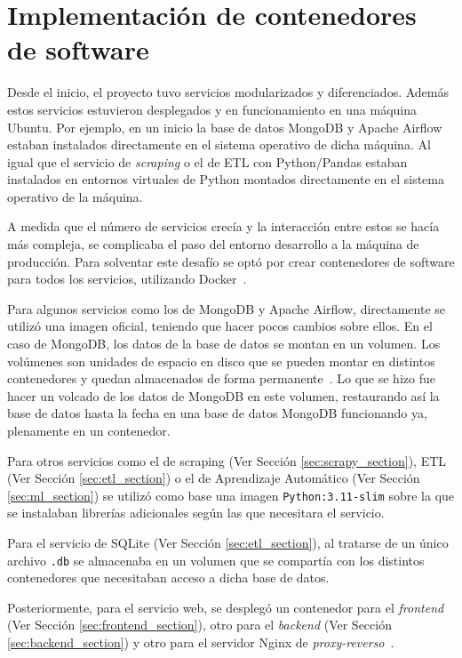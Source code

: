 \clearpage
\section{Implementación de contenedores de software}\label{sec:implementacion_docker}

Desde el inicio, el proyecto tuvo servicios modularizados y diferenciados. Además estos servicios estuvieron desplegados y en funcionamiento en una máquina Ubuntu. Por ejemplo, en un inicio la base de datos MongoDB y Apache Airflow estaban instalados directamente en el sistema operativo de dicha máquina. Al igual que el servicio de \textit{scraping} o el de ETL con Python/Pandas estaban instalados en entornos virtuales de Python montados directamente en el sistema operativo de la máquina. 

A medida que el número de servicios crecía y la interacción entre estos se hacía más compleja, se complicaba el paso del entorno desarrollo a la máquina de producción. Para solventar este desafío se optó por crear contenedores de software para todos los servicios, utilizando Docker~\cite{merkel2014docker}. 

Para algunos servicios como los de MongoDB y Apache Airflow, directamente se utilizó una imagen oficial, teniendo que hacer pocos cambios sobre ellos. En el caso de MongoDB, los datos de la base de datos se montan en un volumen. Los volúmenes son unidades de espacio en disco que se pueden montar en distintos contenedores y quedan almacenados de forma permanente~\cite{merkel2014docker}. Lo que se hizo fue hacer un volcado de los datos de MongoDB en este volumen, restaurando así la base de datos hasta la fecha en una base de datos MongoDB funcionando ya, plenamente en un contenedor.

Para otros servicios como el de scraping (Ver Sección \ref{sec:scrapy_section}), ETL (Ver Sección \ref{sec:etl_section}) o el de Aprendizaje Automático (Ver Sección \ref{sec:ml_section}) se utilizó como base una imagen \texttt{Python:3.11-slim} sobre la que se instalaban librerías adicionales según las que necesitara el servicio. 

Para el servicio de SQLite (Ver Sección \ref{sec:etl_section}), al tratarse de un único archivo \texttt{.db} se almacenaba en un volumen que se compartía con los distintos contenedores que necesitaban acceso a dicha base de datos.

Posteriormente, para el servicio web, se desplegó un contenedor para el \textit{frontend} (Ver Sección \ref{sec:frontend_section}), otro para el \textit{backend} (Ver Sección \ref{sec:backend_section}) y otro para el servidor Nginx de \textit{proxy-reverso}~\cite{nginx}.

